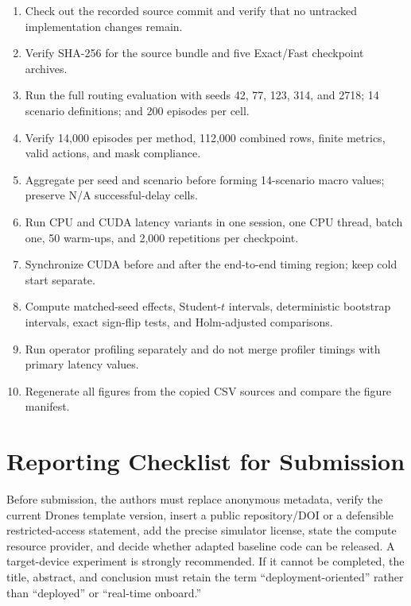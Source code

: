 \documentclass[drones,article,submit,moreauthors]{Definitions/mdpi}
\begin{document}
\begin{enumerate}
\item Check out the recorded source commit and verify that no untracked implementation changes remain.
\item Verify SHA-256 for the source bundle and five Exact/Fast checkpoint archives.
\item Run the full routing evaluation with seeds 42, 77, 123, 314, and 2718; 14 scenario definitions; and 200 episodes per cell.
\item Verify 14,000 episodes per method, 112,000 combined rows, finite metrics, valid actions, and mask compliance.
\item Aggregate per seed and scenario before forming 14-scenario macro values; preserve N/A successful-delay cells.
\item Run CPU and CUDA latency variants in one session, one CPU thread, batch one, 50 warm-ups, and 2,000 repetitions per checkpoint.
\item Synchronize CUDA before and after the end-to-end timing region; keep cold start separate.
\item Compute matched-seed effects, Student-$t$ intervals, deterministic bootstrap intervals, exact sign-flip tests, and Holm-adjusted comparisons.
\item Run operator profiling separately and do not merge profiler timings with primary latency values.
\item Regenerate all figures from the copied CSV sources and compare the figure manifest.
\end{enumerate}

\section{Reporting Checklist for Submission}

Before submission, the authors must replace anonymous metadata, verify the current Drones template version, insert a public repository/DOI or a defensible restricted-access statement, add the precise simulator license, state the compute resource provider, and decide whether adapted baseline code can be released. A target-device experiment is strongly recommended. If it cannot be completed, the title, abstract, and conclusion must retain the term ``deployment-oriented'' rather than ``deployed'' or ``real-time onboard.''
\end{document}
